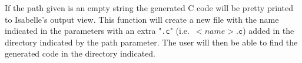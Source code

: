 If the path given is an empty string the generated C code will be pretty printed to Isabelle's output view.
This function will create a new file with the name indicated in the parameters with an extra "\verb|.c|" (i.e.\ $<name>\mathtt{.c}$) added in the directory indicated by the path parameter.
The user will then be able to find the generated code in the directory indicated.
